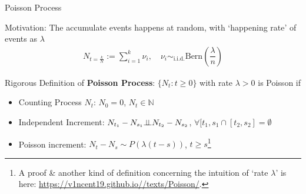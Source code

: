 \begin{point}
    Poisson Process\hypertarget{PoissonProcess}{}
\end{point}

Motivation: The accumulate events happens at random, with `happening rate' of events as $ \lambda  $
\begin{align}
    N_{t=\frac{k}{N}}:= \sum_{i=1}^k \nu  _i,\quad \nu  _i\sim_{\mathrm{i.i.d.} } \mathrm{Bern}(\dfrac{\lambda }{n}) 
\end{align}

Rigorous Definition of \textbf{Poisson Process}: $ \{N_t:t\geq 0\} $ with rate $ \lambda >0 $ is Poisson if 
\begin{itemize}[topsep=2pt,itemsep=0pt]
    \item Counting Process $ N_t $: $ N_0=0 $, $ N_t\in\mathbb{N} $
    \item Independent Increment: $ N_{t_1}-N_{s_1}\bot\!\!\!\bot N_{t_2}-N_{s_2} $, $ \forall [t_1,s_1\cap [t_2,s_2]=\emptyset $
    \item Poisson increment: $ N_t-N_s\sim P\left(\lambda (t-s)\right) $, $ t\geq s $\footnote{A proof \& another kind of definition concerning the intuition of `rate $ \lambda  $' is here: \url{https://v1ncent19.github.io//texts/Poisson/}.}
\end{itemize}

